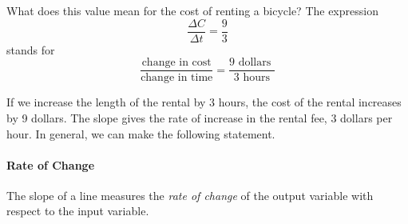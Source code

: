 \documentclass[10pt,]{book}
\theoremstyle{plain}
\theoremstyle{definition}
\theoremstyle{definition}
\theoremstyle{definition}
\theoremstyle{definition}
\theoremstyle{definition}
\numberwithin{equation}{section}
\begin{document}
    What does this value mean for the cost of renting a bicycle? The expression
    \begin{equation*}\frac{\Delta C}{\Delta t}= \frac{9}{3}\end{equation*}
    stands for
    \begin{equation*}\frac{\text{change in cost}}{\text{change in time}}= \frac{9 \text{ dollars }}{3 \text{ hours}}\end{equation*}
%
\par

    If we increase the length of the rental by 3 hours, the cost of the rental increases by 9 dollars. The slope gives the rate of increase in the rental fee, 3 dollars per hour. In general, we can make the following statement.
%
\typeout{************************************************}
\typeout{************************************************}
\paragraph[Rate of Change]{Rate of Change}\label{paragraphs-12}

    The slope of a line measures the \emph{rate of change} of the output variable with respect to the input variable.
%
\par
\end{document}
